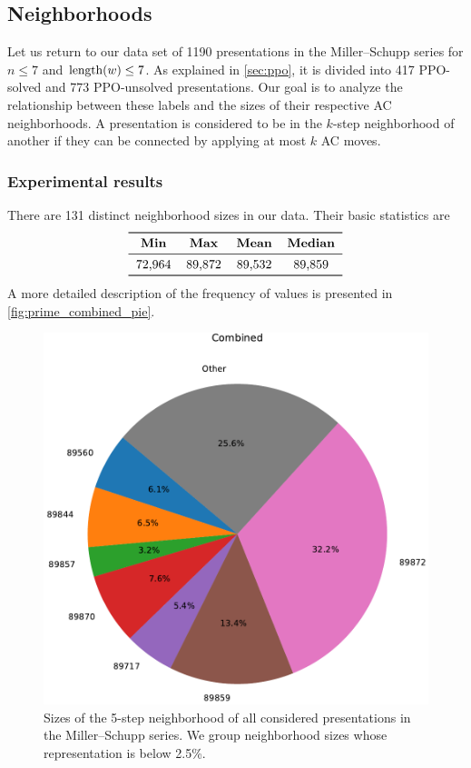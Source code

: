 \subsection{Neighborhoods}

Let us return to our data set of 1190 presentations in the Miller–Schupp series for \(n \leq 7\) and \(\operatorname{length}(w) \leq 7\).
As explained in \autoref{sec:ppo}, it is divided into 417 PPO-solved and 773 PPO-unsolved presentations.
Our goal is to analyze the relationship between these labels and the sizes of their respective AC neighborhoods.
A presentation is considered to be in the \(k\)-step neighborhood of another if they can be connected by applying at most \(k\) AC moves.

\subsubsection{Experimental results}

There are 131 distinct neighborhood sizes in our data.
Their basic statistics are
\[
\begin{tabular}{cccccc}
	\toprule
	\textbf{Min} & \textbf{Max} & \textbf{Mean} & \textbf{Median} \\
	\midrule
	72,964 & 89,872 & 89,532 & 89,859 \\
	\bottomrule
\end{tabular}
\]
A more detailed description of the frequency of values is presented in \autoref{fig:prime_combined_pie}.

\begin{figure}
	\includegraphics[scale=.4]{fig/prime_combined_pie_rl_cropped.pdf}
	\caption{Sizes of the 5-step neighborhood of all considered presentations in the Miller–Schupp series. We group neighborhood sizes whose representation is below 2.5\%.}
	\label{fig:prime_combined_pie}
\end{figure}

